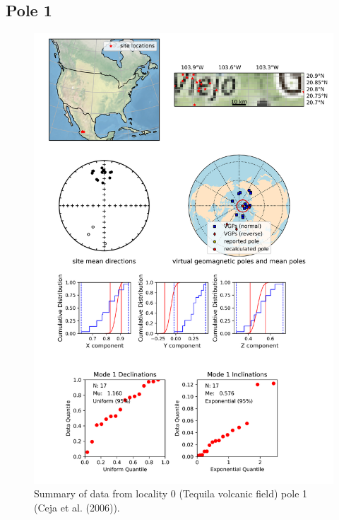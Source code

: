\subsection{Pole 1}


\begin{figure}[H]
\centering
\includegraphics[width=5 in]{./0/1/pole_summary.png}
\caption{Summary of data from locality 0 (Tequila volcanic field) pole 1 (Ceja et al. (2006)).}
\end{figure}
